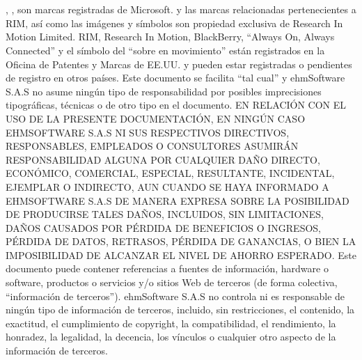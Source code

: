 \chapter{}

\microsoft, \windows, \excel son marcas registradas de Microsoft.
\blackberry y las marcas relacionadas pertenecientes a RIM, as\'i como las
im\'agenes y
s\'imbolos son propiedad exclusiva de Research In Motion Limited. RIM, Research
In
Motion,
BlackBerry, ``Always On, Always Connected'' y el s\'imbolo del ``sobre
en movimiento''
est\'an
registrados en la Oficina de Patentes y Marcas de EE.UU. y pueden estar
registradas o
pendientes de registro en otros pa\'ises.
Este documento se facilita ``tal cual'' y ehmSoftware S.A.S no asume ning\'un
tipo
de
responsabilidad por posibles imprecisiones tipogr\'aficas, t\'ecnicas o de otro
tipo
en el
documento.
EN RELACI\'ON CON EL USO DE LA PRESENTE DOCUMENTACI\'ON, EN NING\'UN
CASO EHMSOFTWARE S.A.S NI SUS RESPECTIVOS DIRECTIVOS, RESPONSABLES,
EMPLEADOS O CONSULTORES ASUMIR\'AN RESPONSABILIDAD ALGUNA POR
CUALQUIER DA\~NO DIRECTO, ECON\'OMICO, COMERCIAL, ESPECIAL, RESULTANTE,
INCIDENTAL, EJEMPLAR O INDIRECTO, AUN CUANDO SE HAYA INFORMADO A
EHMSOFTWARE S.A.S DE MANERA EXPRESA SOBRE LA POSIBILIDAD DE PRODUCIRSE
TALES DA\~NOS, INCLUIDOS, SIN LIMITACIONES, DA\~NOS CAUSADOS POR P\'ERDIDA DE
BENEFICIOS O INGRESOS, P\'ERDIDA DE DATOS, RETRASOS, P\'ERDIDA DE GANANCIAS,
O BIEN LA IMPOSIBILIDAD DE ALCANZAR EL NIVEL DE AHORRO ESPERADO.
Este documento puede contener referencias a fuentes de informaci\'on, hardware o
software,
productos o servicios y/o sitios Web de terceros (de forma colectiva,
``informaci\'on de
terceros''). ehmSoftware S.A.S no controla ni es responsable de ning\'un tipo de
informaci\'on de
terceros, incluido, sin restricciones, el contenido, la exactitud, el
cumplimiento de copyright, la
compatibilidad, el rendimiento, la honradez, la legalidad, la decencia, los
v\'inculos o cualquier
otro aspecto de la informaci\'on de terceros.
